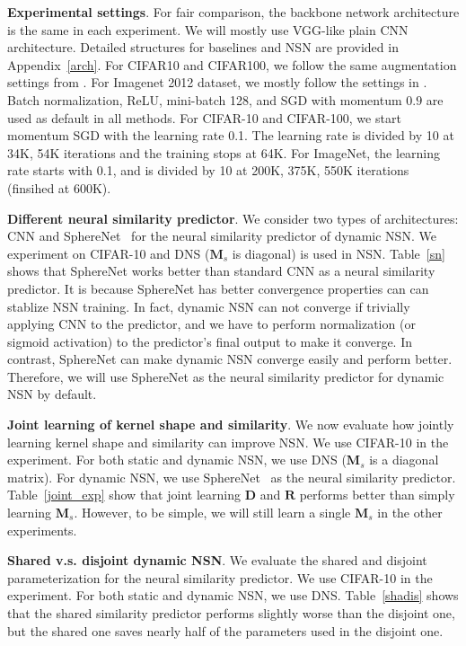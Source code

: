 \textbf{Experimental settings}. For fair comparison, the backbone network architecture is the same in each experiment. We will mostly use VGG-like plain CNN architecture. Detailed structures for baselines and NSN are provided in Appendix~\ref{arch}. For CIFAR10 and CIFAR100, we follow the same augmentation settings from \cite{he2016identity}. For Imagenet 2012 dataset, we mostly follow the settings in \cite{krizhevsky2012imagenet}. Batch normalization, ReLU, mini-batch 128, and SGD with momentum $0.9$ are used as default in all methods. For CIFAR-10 and CIFAR-100, we start momentum SGD with the learning rate 0.1. The learning rate is divided by 10 at 34K, 54K iterations and the training stops at 64K. For ImageNet, the learning rate starts with 0.1, and is divided by 10 at 200K, 375K, 550K iterations (finsihed at 600K).
\par

\textbf{Different neural similarity predictor}. We consider two types of architectures:  CNN and SphereNet~\cite{liu2017hyper} for the neural similarity predictor of dynamic NSN. We experiment on CIFAR-10 and DNS ($\bm{M}_s$ is diagonal) is used in NSN. Table~\ref{sn} shows that SphereNet works better than standard CNN as a neural similarity predictor. It is because SphereNet has better convergence properties can can stablize NSN training. In fact, dynamic NSN can not converge if trivially applying CNN to the predictor, and we have to perform normalization (or sigmoid activation) to the predictor's final output to make it converge. In contrast, SphereNet can make dynamic NSN converge easily and perform better. Therefore, we will use SphereNet as the neural similarity predictor for dynamic NSN by default.

\par

\textbf{Joint learning of kernel shape and similarity}. We now evaluate how jointly learning kernel shape and similarity can improve NSN. We use CIFAR-10 in the experiment. For both static and dynamic NSN, we use DNS ($\bm{M}_s$ is a diagonal matrix). For dynamic NSN, we use SphereNet~\cite{liu2017hyper} as the neural similarity predictor. Table~\ref{joint_exp} show that joint learning $\bm{D}$ and $\bm{R}$ performs better than simply learning $\bm{M}_s$. However, to be simple, we will still learn a single $\bm{M}_s$ in the other experiments.

\par

\textbf{Shared v.s. disjoint dynamic NSN}. We evaluate the shared and disjoint parameterization for the neural similarity predictor. We use CIFAR-10 in the experiment. For both static and dynamic NSN, we use DNS. Table~\ref{shadis} shows that the shared similarity predictor performs slightly worse than the disjoint one, but the shared one saves nearly half of the parameters used in the disjoint one. 

